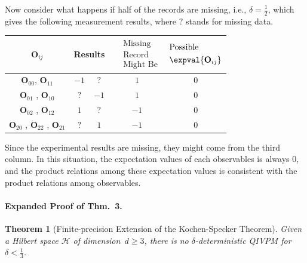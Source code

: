 \documentclass[english,reprint, aps, prl,superscriptaddress, showpacs,
showkeys, longbibliography, amsmath, amssymb, floatfix]{revtex4-1}
\theoremstyle{plain}
\newtheorem{thm}{Theorem}
\theoremstyle{definition}
\newcommand{\Hilb}{\mathcal{H}}
\newcommand{\missing}{?}
\begin{document}
Now consider what happens if half of the records are missing, i.e.,
$\delta=\frac{1}{2}$, which gives the following measurement results,
where $\missing$ stands for missing data.
\begin{center}
\begin{tabular}{ccccc}
\toprule 
\addlinespace
$\mathbf{O}_{ij}$  & \multicolumn{2}{c}{Results} & $\begin{aligned} & \textrm{Missing}\\
 & \textrm{Record}\\
 & \textrm{Might Be}
\end{aligned}
$ & $\begin{aligned} & \textrm{Possible}\\
 & \expval{\mathbf{O}_{ij}}
\end{aligned}
$\tabularnewline
\midrule
\midrule 
\addlinespace
$\mathbf{O}_{00}$, $\mathbf{O}_{11}$ & $-1$ & $\missing$ & $1$ & $0$\tabularnewline
\midrule 
\addlinespace
$\mathbf{O}_{01}$ , $\mathbf{O}_{10}$  & $\missing$ & $-1$ & $1$ & $0$\tabularnewline
\midrule 
\addlinespace
$\mathbf{O}_{02}$ , $\mathbf{O}_{12}$ & $1$ & $\missing$ & $-1$ & $0$\tabularnewline
\midrule 
\addlinespace
$\mathbf{O}_{20}$ , $\mathbf{O}_{22}$ , $\mathbf{O}_{21}$  & $\missing$ & $1$ & $-1$ & $0$\tabularnewline
\bottomrule
\end{tabular}
\par\end{center}

\noindent Since the experimental results are missing, they might come
from the third column. In this situation, the expectation values of
each observables is always $0$, and the product relations among these
expectation values is consistent with the product relations among
observables. 

\bigskip 

\paragraph*{Expanded Proof of Thm.~3.}

\begin{thm}[Finite-precision Extension of the Kochen-Specker Theorem]
\label{cor:Kochen-Specker-IVPM} Given a Hilbert space $\Hilb$ of
dimension~$d\ge3$, there is no $\delta$-deterministic QIVPM for
$\delta<\frac{1}{3}$.\end{thm}
\end{document}
